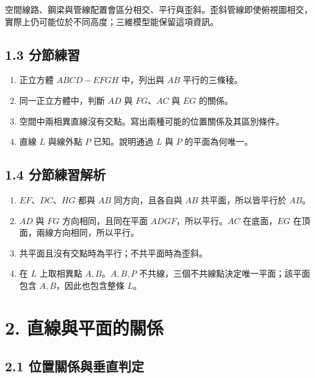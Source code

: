 \documentclass[11pt,a4paper]{article}
\providecommand{\tightlist}{%
  \setlength{\itemsep}{0pt}\setlength{\parskip}{0pt}}
\begin{document}
空間線路、鋼梁與管線配置會區分相交、平行與歪斜。歪斜管線即使俯視圖相交，實際上仍可能位於不同高度；三維模型能保留這項資訊。

\subsection{1.3 分節練習}\label{ux5206ux7bc0ux7df4ux7fd2}

\begin{enumerate}
\def\labelenumi{\arabic{enumi}.}
\tightlist
\item
  正立方體 \(ABCD-EFGH\) 中，列出與 \(AB\) 平行的三條稜。
\item
  同一正立方體中，判斷 \(AD\) 與 \(FG\)、\(AC\) 與 \(EG\) 的關係。
\item
  空間中兩相異直線沒有交點。寫出兩種可能的位置關係及其區別條件。
\item
  直線 \(L\) 與線外點 \(P\) 已知。說明通過 \(L\) 與 \(P\) 的平面為何唯一。
\end{enumerate}

\subsection{1.4 分節練習解析}\label{ux5206ux7bc0ux7df4ux7fd2ux89e3ux6790}

\begin{enumerate}
\def\labelenumi{\arabic{enumi}.}
\tightlist
\item
  \(EF\)、\(DC\)、\(HG\) 都與 \(AB\) 同方向，且各自與 \(AB\) 共平面，所以皆平行於 \(AB\)。
\item
  \(AD\) 與 \(FG\) 方向相同，且同在平面 \(ADGF\)，所以平行。\(AC\) 在底面，\(EG\) 在頂面，兩線方向相同，所以平行。
\item
  共平面且沒有交點時為平行；不共平面時為歪斜。
\item
  在 \(L\) 上取相異點 \(A,B\)。\(A,B,P\) 不共線，三個不共線點決定唯一平面；該平面包含 \(A,B\)，因此也包含整條 \(L\)。
\end{enumerate}

\section{2. 直線與平面的關係}\label{ux76f4ux7ddaux8207ux5e73ux9762ux7684ux95dcux4fc2}

\subsection{2.1 位置關係與垂直判定}\label{ux4f4dux7f6eux95dcux4fc2ux8207ux5782ux76f4ux5224ux5b9a}
\end{document}
